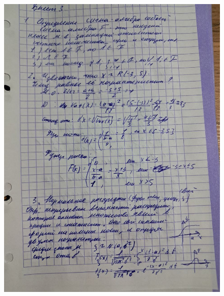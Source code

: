 \documentclass{article}
\begin{document}
\begin{figure}[H]
    \centering
    \includegraphics[width=1\linewidth]{photo_5323477539961828015_y.jpg}
\end{figure}
\end{document}
